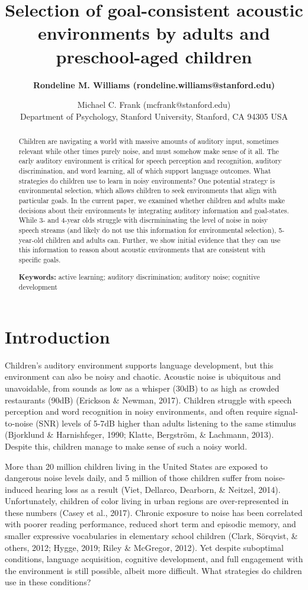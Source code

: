 \documentclass[10pt, letterpaper]{article}
\title{Selection of goal-consistent acoustic environments by adults and
preschool-aged children}
\author{\bf Rondeline M. Williams (rondeline.williams@stanford.edu) \and Michael C. Frank (mcfrank@stanford.edu) \\ Department of Psychology, Stanford University, Stanford, CA 94305 USA}
\begin{document}
\maketitle

\begin{abstract}
Children are navigating a world with massive amounts of auditory input,
sometimes relevant while other times purely noise, and must somehow make
sense of it all. The early auditory environment is critical for speech
perception and recognition, auditory discrimination, and word learning,
all of which support language outcomes. What strategies do children use
to learn in noisy environments? One potential strategy is environmental
selection, which allows children to seek environments that align with
particular goals. In the current paper, we examined whether children and
adults make decisions about their environments by integrating auditory
information and goal-states. While 3- and 4-year olds struggle with
discrmininating the level of noise in noisy speech streams (and likely
do not use this information for environmental selection), 5-year-old
children and adults can. Further, we show initial evidence that they can
use this information to reason about acoustic environments that are
consistent with specific goals.

\textbf{Keywords:}
active learning; auditory discrimination; auditory noise; cognitive
development
\end{abstract}

\hypertarget{introduction}{%
\section{Introduction}\label{introduction}}

Children's auditory environment supports language development, but this
environment can also be noisy and chaotic. Acoustic noise is ubiquitous
and unavoidable, from sounds as low as a whisper (30dB) to as high as
crowded restaurants (90dB) (Erickson \& Newman, 2017). Children struggle
with speech perception and word recognition in noisy environments, and
often require signal-to-noise (SNR) levels of 5-7dB higher than adults
listening to the same stimulus (Bjorklund \& Harnishfeger, 1990; Klatte,
Bergström, \& Lachmann, 2013). Despite this, children manage to make
sense of such a noisy world.

More than 20 million children living in the United States are exposed to
dangerous noise levels daily, and 5 million of those children suffer
from noise-induced hearing loss as a result (Viet, Dellarco, Dearborn,
\& Neitzel, 2014). Unfortunately, children of color living in urban
regions are over-represented in these numbers (Casey et al., 2017).
Chronic exposure to noise has been correlated with poorer reading
performance, reduced short term and episodic memory, and smaller
expressive vocabularies in elementary school children (Clark, Sörqvist,
\& others, 2012; Hygge, 2019; Riley \& McGregor, 2012). Yet despite
suboptimal conditions, language acquisition, cognitive development, and
full engagement with the environment is still possible, albeit more
difficult. What strategies do children use in these conditions?
\end{document}
